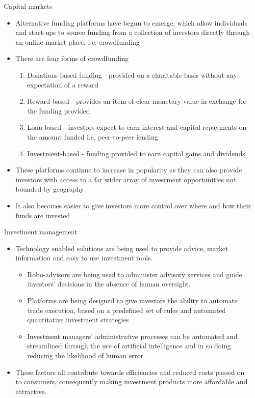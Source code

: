 \documentclass[10pt]{beamer}
\begin{document}
\begin{frame}{Capital markets}
	\begin{itemize}
		\item  Alternative funding platforms have begun to emerge, which allow individuals and start-ups to source funding from a collection of investors directly through an online market place, i.e. crowdfunding
		\item There are four forms of crowdfunding
		\begin{small}
			\begin{enumerate}
				\item Donations-based funding - provided on a charitable basis without any expectation of a reward
				\item Reward-based - provides an item of clear monetary value in exchange for the funding provided
				\item Loan-based - investors expect to earn interest and capital repayments on the amount funded i.e. peer-to-peer lending
				\item Investment-based - funding provided to earn capital gains and dividends.
			\end{enumerate}
		\end{small}
		\item These platforms continue to increase in popularity as they can also provide investors with access to a far wider array of investment opportunities not bounded by geography
		\item It also becomes easier to give investors more control over where and how their funds are invested
	\end{itemize}
\end{frame}


\begin{frame}{Investment management}
	\begin{itemize}
		\item Technology enabled solutions are being used to provide advice, market information and easy to use investment tools.
		\begin{itemize}
			\item Robo-advisors are being used to administer advisory services and guide investors' decisions in the absence of human oversight.
			\item Platforms are being designed to give investors the ability to automate trade execution, based on a predefined set of rules and automated quantitative investment strategies
			\item Investment managers' administrative processes can be automated and streamlined through the use of artificial intelligence and in so doing reducing the likelihood of human error
		\end{itemize}
		\item These factors all contribute towards efficiencies and reduced costs passed on to consumers, consequently making investment products more affordable and attractive.
	\end{itemize}
\end{frame}
\end{document}
